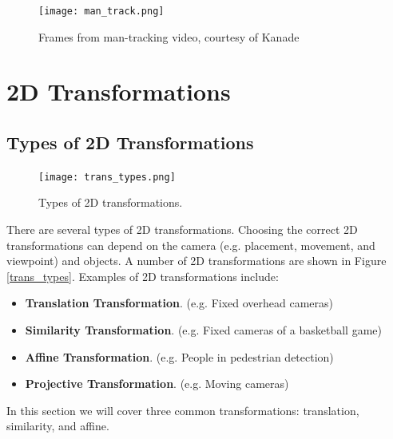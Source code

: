 \documentclass{article}
\begin{document}
\begin{figure}[h]
  \centering
  \texttt{[image: man\_track.png]}
  \caption{Frames from man-tracking video, courtesy of Kanade}
\end{figure}

\section{2D Transformations}
\subsection{Types of 2D Transformations}
\begin{figure}[h]
  \centering
  \texttt{[image: trans\_types.png]}
  \caption{Types of 2D transformations.}
\end{figure}\label{trans_types}

There are several types of 2D transformations.
Choosing the correct 2D transformations can depend on the camera (e.g. placement, movement, and viewpoint) and objects.
A number of 2D transformations are shown in Figure \ref{trans_types}.
Examples of 2D transformations include:
\begin{itemize}
  \item \textbf{Translation Transformation}. (e.g. Fixed overhead cameras)
    \item \textbf{Similarity Transformation}. (e.g. Fixed cameras of a basketball game)
    \item \textbf{Affine Transformation}. (e.g. People in pedestrian detection)
    \item \textbf{Projective Transformation}. (e.g. Moving cameras)
\end{itemize}
In this section we will cover three common transformations: translation, similarity, and affine.
\end{document}
